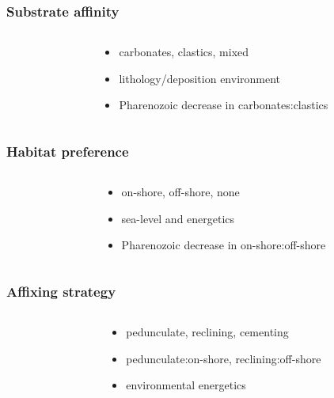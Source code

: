 \documentclass{beamer} \usepackage{amsmath,amsthm}
\begin{document}
\begin{frame}
  \frametitle{Substrate affinity}

  \begin{columns}
    \begin{column}{0.5\textwidth}
    \end{column}
    \begin{column}{0.5\textwidth}
      \begin{itemize}
        \item carbonates, clastics, mixed
        \item lithology/deposition environment
        \item Pharenozoic decrease in carbonates:clastics
      \end{itemize}
    \end{column}
  \end{columns}
\end{frame}

\begin{frame}
  \frametitle{Habitat preference}

  \begin{columns}
    \begin{column}{0.5\textwidth}
    \end{column}
    \begin{column}{0.5\textwidth}
      \begin{itemize}
        \item on-shore, off-shore, none
        \item sea-level and energetics
        \item Pharenozoic decrease in on-shore:off-shore
      \end{itemize}
    \end{column}
  \end{columns}
\end{frame}

\begin{frame}
  \frametitle{Affixing strategy}

  \begin{columns}
    \begin{column}{0.5\textwidth}
    \end{column}
    \begin{column}{0.5\textwidth}
      \begin{itemize}
        \item pedunculate, reclining, cementing
        \item pedunculate:on-shore, reclining:off-shore
        \item environmental energetics
      \end{itemize}
    \end{column}
  \end{columns}
\end{frame}
\end{document}
